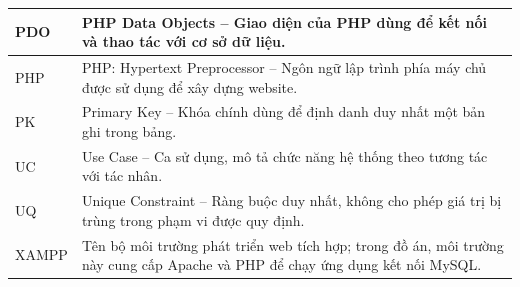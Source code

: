 {\begin{longtable}{|p{}|p{}|}
    PDO & PHP Data Objects -- Giao diện của PHP dùng để kết nối và thao tác với cơ sở dữ liệu. \\ \hline
    PHP & PHP: Hypertext Preprocessor -- Ngôn ngữ lập trình phía máy chủ được sử dụng để xây dựng website. \\ \hline
    PK & Primary Key -- Khóa chính dùng để định danh duy nhất một bản ghi trong bảng. \\ \hline
    UC & Use Case -- Ca sử dụng, mô tả chức năng hệ thống theo tương tác với tác nhân. \\ \hline
    UQ & Unique Constraint -- Ràng buộc duy nhất, không cho phép giá trị bị trùng trong phạm vi được quy định. \\ \hline
    XAMPP & Tên bộ môi trường phát triển web tích hợp; trong đồ án, môi trường này cung cấp Apache và PHP để chạy ứng dụng kết nối MySQL. \\ \hline
  \end{longtable}%
}
